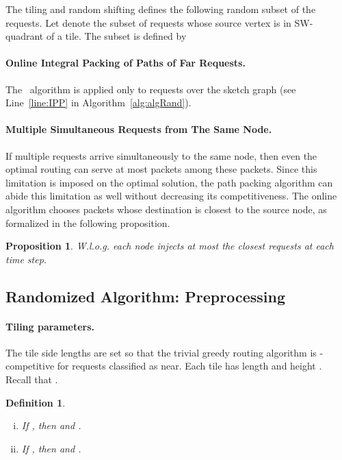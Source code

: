 \documentclass[11pt]{article}
\newtheorem{proposition}[theorem]{Proposition}
\newtheorem{defn}[theorem]{Definition}
\newcommand{\route}{\text{\sc{ipp}}}
\newcommand{\IPP}{\route}
\newenvironment{proof sketch}[1]{\noindent {\emph{Proof sketch of #1:}}}{\hfill \qed}
\begin{document}
The tiling and random shifting defines the following random subset of the requests. Let
 denote the subset of requests whose source vertex is in SW-quadrant of a tile.
The subset  is defined by


\paragraph{Online Integral Packing of Paths of Far Requests.}
The \IPP\ algorithm is applied only to  requests
over the sketch graph  (see Line~\ref{line:IPP} in
Algorithm~\ref{alg:algRand}).

\begin{comment}
In the randomized algorithm the reduction deals with the following issues: (1)~Handling requests only \emph{between} tiles (we deal with requests inside a tile separately), (2)~the \IPP\ algorithm the capacities of the sketch graph  are \emph{not changed}, and (iii)~as before, a specific sink destination is added for each request. Hence, all we need is to add  sink nodes (see Figure~\ref{fig:st}).
\end{comment}

\paragraph{Multiple Simultaneous Requests from The Same Node.}
If multiple requests arrive simultaneously to the same
node, then even the optimal routing can serve at most 
packets among these packets. Since this limitation is
imposed on the optimal solution, the path packing algorithm
can abide this limitation as well without decreasing its
competitiveness. The online algorithm chooses  packets
whose destination is closest to the source node, as
formalized in the following proposition.

\begin{proposition}\label{prop:filter}
    W.l.o.g. each node injects at most the closest  requests at each time step.
\end{proposition}


\subsection{Randomized Algorithm: Preprocessing}\label{sec:preprocess}

\paragraph{Tiling parameters.}
The tile side lengths are set so that the trivial greedy routing algorithm is -competitive for requests classified as near. Each tile has length  and
height .
Recall that .
\begin{defn}\label{def:xy}
    \begin{enumerate}[(i)]
    \item
    If , then
     and .
    \item
    If , then
      and .
\end{enumerate}
\end{defn}
\end{document}
